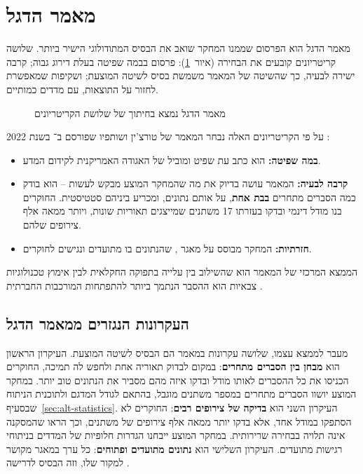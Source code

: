 \section{מאמר הדגל}
\label{sec:lit-flagship}

מאמר הדגל הוא הפרסום שממנו המחקר שואב את הבסיס המתודולוגי הישיר ביותר. שלושה קריטריונים קובעים את הבחירה (איור~\ref{fig:flagship}): פרסום בבמה שפיטה בעלת דירוג גבוה; קרבה ישירה לבעיה, כך שהשיטה של המאמר משמשת בסיס לשיטה המוצעת; ושקיפות שמאפשרת לחזור על התוצאות, עם מדדים כמותיים.

\begin{figure}[htbp]
  \centering
  
  \caption{מאמר הדגל נמצא בחיתוך של שלושת הקריטריונים}
  \label{fig:flagship}
\end{figure}

על פי הקריטריונים האלה נבחר המאמר של טורצ'ין ושותפיו שפורסם ב־ בשנת 2022 \cite{turchin2022disentangling}:

\begin{itemize}
  \item \textbf{במה שפיטה:}  הוא כתב עת שפיט ומוביל של האגודה האמריקנית לקידום המדע.
  \item \textbf{קרבה לבעיה:} המאמר עושה בדיוק את מה שהמחקר המוצע מבקש לעשות – הוא בודק כמה הסברים מתחרים \textbf{בבת אחת}, על אותם נתונים, ומכריע ביניהם סטטיסטית. החוקרים בנו מודל דינמי ובדקו בעזרתו 17 משתנים שמייצגים תאוריות שונות, ויותר ממאה אלף צירופים שלהם.
  \item \textbf{חזרתיות:} המחקר מבוסס על מאגר , שהנתונים בו מתועדים ונגישים לחוקרים.
\end{itemize}

הממצא המרכזי של המאמר הוא שהשילוב בין עלייה בתפוקה החקלאית לבין אימוץ טכנולוגיות צבאיות הוא ההסבר הנתמך ביותר להתפתחות המורכבות החברתית \cite{turchin2022disentangling}.

\subsection*{העקרונות הנגזרים ממאמר הדגל}

מעבר לממצא עצמו, שלושה עקרונות במאמר הם הבסיס לשיטה המוצעת. העיקרון הראשון הוא \textbf{מבחן בין הסברים מתחרים}: במקום לבדוק תאוריה אחת ולחפש לה תמיכה, החוקרים הכניסו את כל ההסברים לאותו מודל ובדקו איזה מהם מסביר את הנתונים טוב יותר. במחקר המוצע יושוו הסברים מתחרים במספר משתנים מוגבל, בהתאם לגודל המדגם ולתוכנית הניתוח שבסעיף~\ref{sec:alt-statistics}. העיקרון השני הוא \textbf{בדיקה של צירופים רבים}: החוקרים לא הסתפקו במודל אחד, אלא בדקו יותר ממאה אלף צירופים של משתנים, וכך הראו שהמסקנה אינה תלויה בבחירה שרירותית. במחקר המוצע ייבחנו הגדרות חלופיות של המדדים בניתוחי רגישות מתועדים. העיקרון השלישי הוא \textbf{נתונים מתועדים ופתוחים}: כל ערך במאגר מקושר למקור שלו, וזה הבסיס לדרישה .

